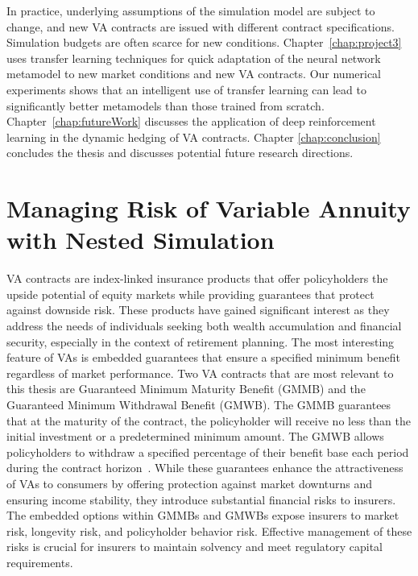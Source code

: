 In practice, underlying assumptions of the simulation model are subject to change, and new VA contracts are issued with different contract specifications.
Simulation budgets are often scarce for new conditions.
Chapter~\ref{chap:project3} uses transfer learning techniques for quick adaptation of the neural network metamodel to new market conditions and new VA contracts.
Our numerical experiments shows that an intelligent use of transfer learning can lead to significantly better metamodels than those trained from scratch.
Chapter~\ref{chap:futureWork} discusses the application of deep reinforcement learning in the dynamic hedging of VA contracts.
Chapter \ref{chap:conclusion} concludes the thesis and discusses potential future research directions.

\section{Managing Risk of Variable Annuity with Nested Simulation}

VA contracts are index-linked insurance products that offer policyholders the upside potential of equity markets while providing guarantees that protect against downside risk.
These products have gained significant interest as they address the needs of individuals seeking both wealth accumulation and financial security, especially in the context of retirement planning.
The most interesting feature of VAs is embedded guarantees that ensure a specified minimum benefit regardless of market performance.
Two VA contracts that are most relevant to this thesis are Guaranteed Minimum Maturity Benefit (GMMB) and the Guaranteed Minimum Withdrawal Benefit (GMWB). 
The GMMB guarantees that at the maturity of the contract, the policyholder will receive no less than the initial investment or a predetermined minimum amount. 
The GMWB allows policyholders to withdraw a specified percentage of their benefit base each period during the contract horizon~\citep{hardy2003investment}.
While these guarantees enhance the attractiveness of VAs to consumers by offering protection against market downturns and ensuring income stability, they introduce substantial financial risks to insurers. 
The embedded options within GMMBs and GMWBs expose insurers to market risk, longevity risk, and policyholder behavior risk. 
Effective management of these risks is crucial for insurers to maintain solvency and meet regulatory capital requirements.

